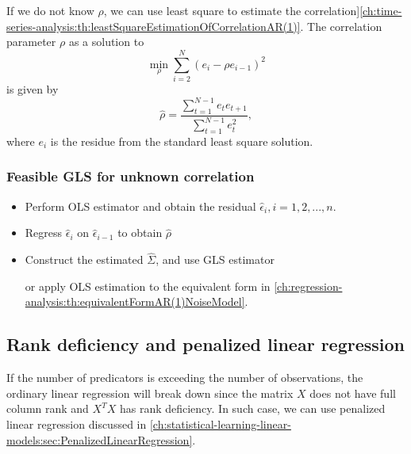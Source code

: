 \begin{refsection}
\begin{remark}
\begin{itemize}
\end{itemize}	
	
	
\end{remark}



\begin{remark}\cite[254]{theil1971principles}
If we do not know $\rho$, we can use least square to estimate  the correlation]\autoref{ch:time-series-analysis:th:leastSquareEstimationOfCorrelationAR(1)}.
		The correlation parameter $\rho$ as a solution to	
		$$\min_{\rho} \sum_{i=2}^N (e_i - \rho e_{i-1})^2$$
		is given by
		$$\hat{\rho} = \frac{\sum_{t=1}^{N-1} e_t e_{t+1}}{\sum_{t=1}^{N-1} e_t^2},$$
		where $e_i$ is the residue from the standard least square solution.	
\end{remark}

\subsubsection{Feasible GLS for unknown correlation}

\begin{method}\cite[425]{wooldridge2015introductory}
\begin{itemize}
	\item Perform OLS estimator and obtain the residual $\hat{\epsilon}_i, i=1,2,...,n$.
	\item Regress $\hat{\epsilon}_i$ on $\hat{\epsilon}_{i-1}$ to obtain $\hat{\rho}$
	\item Construct the estimated $\hat{\Sigma}$, and use GLS estimator
	
	or apply OLS estimation to the equivalent form in \autoref{ch:regression-analysis:th:equivalentFormAR(1)NoiseModel}.
\end{itemize}
\end{method}

\subsection{Rank deficiency and penalized linear regression}

If the number of predicators is exceeding the number of observations, the ordinary linear regression will break down since the matrix $X$ does not have full column rank and $X^TX$ has rank deficiency. In such case, we can use penalized linear regression discussed in \autoref{ch:statistical-learning-linear-models:sec:PenalizedLinearRegression}.


\end{refsection}

